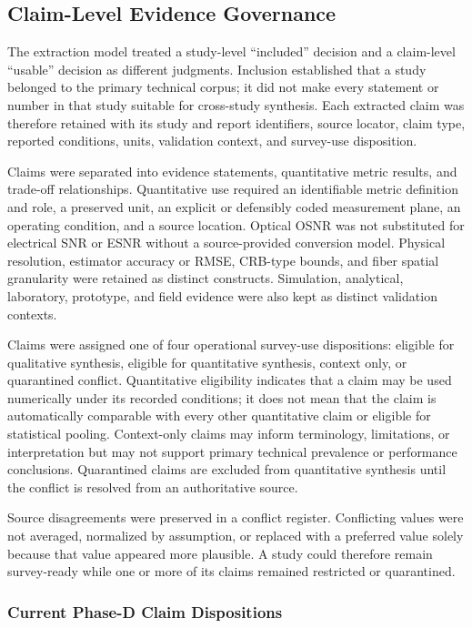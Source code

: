 \subsection{Claim-Level Evidence Governance}
\label{subsec:claim_governance}

The extraction model treated a study-level ``included'' decision and a
claim-level ``usable'' decision as different judgments. Inclusion established
that a study belonged to the primary technical corpus; it did not make every
statement or number in that study suitable for cross-study synthesis. Each
extracted claim was therefore retained with its study and report identifiers,
source locator, claim type, reported conditions, units, validation context,
and survey-use disposition.

Claims were separated into evidence statements, quantitative metric results,
and trade-off relationships. Quantitative use required an identifiable metric
definition and role, a preserved unit, an explicit or defensibly coded
measurement plane, an operating condition, and a source location. Optical
OSNR was not substituted for electrical SNR or ESNR without a source-provided
conversion model. Physical resolution, estimator accuracy or RMSE, CRB-type
bounds, and fiber spatial granularity were retained as distinct constructs.
Simulation, analytical, laboratory, prototype, and field evidence were also
kept as distinct validation contexts.

Claims were assigned one of four operational survey-use dispositions:
eligible for qualitative synthesis, eligible for quantitative synthesis,
context only, or quarantined conflict. Quantitative eligibility indicates that
a claim may be used numerically under its recorded conditions; it does not
mean that the claim is automatically comparable with every other quantitative
claim or eligible for statistical pooling. Context-only claims may inform
terminology, limitations, or interpretation but may not support primary
technical prevalence or performance conclusions. Quarantined claims are
excluded from quantitative synthesis until the conflict is resolved from an
authoritative source.

Source disagreements were preserved in a conflict register. Conflicting
values were not averaged, normalized by assumption, or replaced with a
preferred value solely because that value appeared more plausible. A study
could therefore remain survey-ready while one or more of its claims remained
restricted or quarantined.

\subsubsection{Current Phase-D Claim Dispositions}

